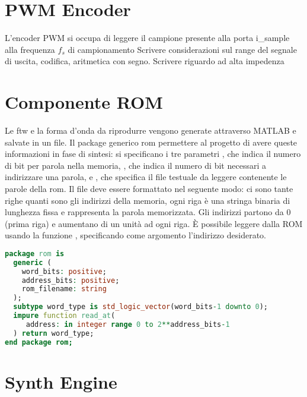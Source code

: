 \section{PWM Encoder}
\label{sec:pwmencoder}

\begin{center}
\end{center}
L'encoder PWM si occupa di leggere il campione presente alla porta i\_sample alla frequenza $f_s$ di campionamento
Scrivere considerazioni sul range del segnale di uscita, codifica, aritmetica con segno.
Scrivere riguardo ad alta impedenza

\section{Componente ROM}
\label{sec:rom}
Le ftw e la forma d'onda da riprodurre vengono generate attraverso MATLAB e salvate in un file.
Il package generico rom permettere al progetto di avere queste informazioni in fase di sintesi: si specificano i tre parametri , che indica il numero di bit per parola nella memoria, , che indica il numero di bit necessari a indirizzare una parola, e , che specifica il file testuale da leggere contenente le parole della rom.
Il file deve essere formattato nel seguente modo: ci sono tante righe quanti sono gli indirizzi della memoria, ogni riga è una stringa binaria
di lunghezza fissa e rappresenta la parola memorizzata.
Gli indirizzi partono da 0 (prima riga) e aumentano di un unità ad ogni riga.
È possibile leggere dalla ROM usando la funzione , specificando come argomento l'indirizzo desiderato.
\begin{lstlisting}[language=VHDL]
package rom is
  generic (
    word_bits: positive;
    address_bits: positive;
    rom_filename: string
  );
  subtype word_type is std_logic_vector(word_bits-1 downto 0);
  impure function read_at(
     address: in integer range 0 to 2**address_bits-1
  ) return word_type;
end package rom;
\end{lstlisting}

\section{Synth Engine}
\label{sec:synthengine}

\begin{center}
\end{center}